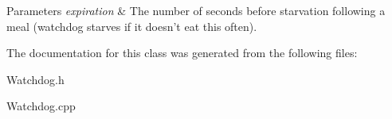 \begin{DoxyParams}{Parameters}
{\em expiration} & The number of seconds before starvation following a meal (watchdog starves if it doesn't eat this often). \\
\hline
\end{DoxyParams}


The documentation for this class was generated from the following files:\begin{DoxyCompactItemize}
\item 
Watchdog.h\item 
Watchdog.cpp\end{DoxyCompactItemize}
